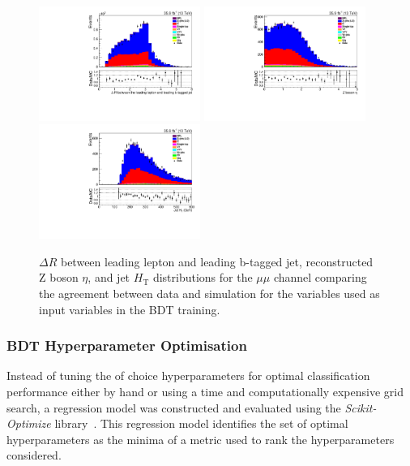 \begin{figure}[h]
\centering
\includegraphics[width=0.47\textwidth]{figs/background-estimation/plots/unblinded/prompt_mumu_ttbarInc/zLep1BjetDelR_NPL_mumu_wMass_mumu.pdf}
\includegraphics[width=0.47\textwidth]{figs/background-estimation/plots/unblinded/prompt_mumu_ttbarInc/zPairEta_NPL_mumu_wMass_mumu.pdf}
\\
\includegraphics[width=0.47\textwidth]{figs/background-estimation/plots/unblinded/prompt_mumu_ttbarInc/jetHt_NPL_mumu_wMass_mumu.pdf}
\caption{
$\Delta R$ between leading lepton and leading b-tagged jet, reconstructed Z boson $\eta$, and jet ${\ensuremath{H_{\mathrm{T}}}}$ distributions for the $\mu\mu$ channel comparing the agreement between data and simulation for the variables used as input variables in the BDT training.}
\label{fig:inputFeaturesDataSimAgreement5}
\end{figure}

\clearpage
\newpage
\subsubsection*{BDT Hyperparameter Optimisation}
Instead of tuning the of choice hyperparameters for optimal classification performance either by hand or using a time and computationally expensive grid search, a regression model was constructed and evaluated using the \emph{Scikit-Optimize} library~\cite{scikit-optimise}.
This regression model identifies the set of optimal hyperparameters as the minima of a metric used to rank the hyperparameters considered.

